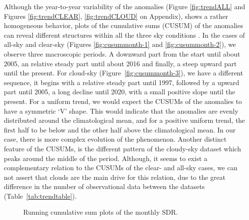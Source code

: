 \documentclass[An awesome
journal,,,moreauthors,pdftex]{Definitions/mdpi}
\begin{document}
Although the year-to-year variability of the anomalies (Figure
\ref{fig:trendALL} and Figures \ref{fig:trendCLEAR},
\ref{fig:trendCLOUD} on Appendix), shows a rather homogeneous behavior,
plots of the cumulative sums (CUSUM) of the anomalies can reveal
different structures within all the three sky conditions
\citep{Regier2019}. In the cases of all-sky and clear-sky (Figures
\ref{fig:cusummonth-1} and \ref{fig:cusummonth-2}), we observe three
macroscopic periods. A downward part from the start until about 2005, an
relative steady part until about 2016 and finally, a steep upward part
until the present. For cloud-sky (Figure~\ref{fig:cusummonth-3}), we
have a different sequence, it begins with a relative steady part until
1997, followed by a upward part until 2005, a long decline until 2020,
with a small positive slope until the present. For a uniform trend, we
would expect the CUSUMs of the anomalies to have a symmetric `V' shape.
This would indicate that the anomalies are evenly distributed around the
climatological mean, and for a positive uniform trend, the first half to
be below and the other half above the climatological mean. In our case,
there is more complex evolution of the phenomenon. Another distinct
feature of the CUSUMs, is the different pattern of the cloudy-sky
dataset which peaks around the middle of the period. Although, it seems
to exist a complementary relation to the CUSUMs of the clear- and
all-sky cases, we can not assert that clouds are the main drive for this
relation, due to the great difference in the number of observational
data between the datasets (Table~\ref{tab:trendtable}).

\begin{figure}[h!]

{\centering {}

}

\caption{Running cumulative sum plots of the monthly SDR.}\label{fig:cusummonth}
\end{figure}
\end{document}
